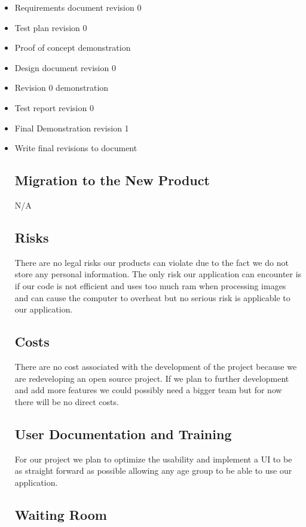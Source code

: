 \documentclass[12pt, titlepage]{article}
\begin{document}
\begin{itemize}
\item Requirements document revision 0
\item Test plan revision 0
\item Proof of concept demonstration
\item Design document revision 0
\item Revision 0 demonstration
\item Test report revision 0
\item Final Demonstration revision 1  
\item Write final revisions to document


\subsection{Migration to the New Product}

N/A

\subsection{Risks}

There are no legal risks our products can violate due to the fact we do not store any personal information. The only risk our application can encounter is if our code is not efficient and uses too much ram when processing images and can cause the computer to overheat but no serious risk is applicable to our application.

\subsection{Costs}

There are no cost associated with the development of the project because we are redeveloping an open source project. If we plan to further development and add more features we could possibly need a bigger team but for now there will be no direct costs.

\subsection{User Documentation and Training}

For our project we plan to optimize the usability and implement a UI to be as straight forward as possible allowing any age group to be able to use our application.

\subsection{Waiting Room}


\end{itemize}
\end{document}

